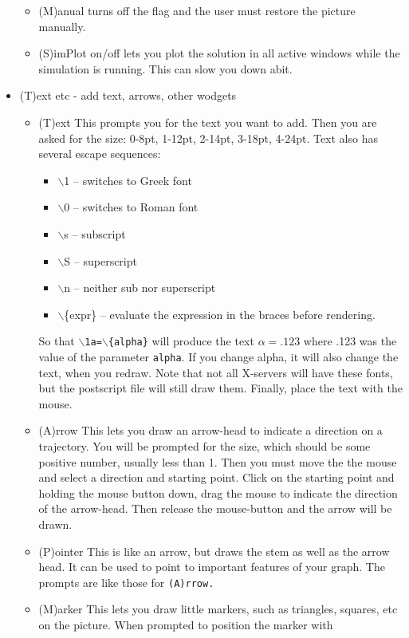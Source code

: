 \documentclass{article}
\begin{document}
\begin{itemize}
\begin{itemize}
\item (M)anual turns off the flag and the user must restore the picture manually.
\item (S)imPlot on/off lets you plot the solution in all active
windows while the simulation is running. This can slow you down abit.
\end{itemize}
\item (T)ext etc - add text, arrows, other wodgets
\begin{itemize}
\item (T)ext This prompts you for the text you want to add.  Then you
are asked for the size: 0-8pt, 1-12pt, 2-14pt,
3-18pt, 4-24pt. Text also has several escape sequences:
\begin{itemize}
\item $\backslash$1 -- switches to Greek font 
\item $\backslash$0 -- switches to Roman font 
\item $\backslash$s -- subscript
\item $\backslash$S -- superscript
\item  $\backslash$n -- neither sub nor superscript
\item $\backslash$\{expr\} -- evaluate the expression in the braces before   rendering.
\end{itemize}
So that {\tt $\backslash$1a=$\backslash$\{alpha\}} will produce the text $\alpha=.123$ where .123 was the value of the parameter {\tt alpha}. If you change alpha, it will also change the text, when you redraw. 
Note that not all X-servers will have these fonts, but the
postscript file will still draw them. Finally, place the text with the
mouse.
\item (A)rrow This lets you draw an arrow-head to indicate a direction
on a trajectory.  You will be prompted for the size, which should be
some positive number, usually less than 1.  Then you must move the the
mouse and select a direction and starting point.  Click on the
starting point and holding the mouse button down, drag the mouse to
indicate the direction of the arrow-head. Then release the
mouse-button and the arrow will be drawn.  
\item (P)ointer This is like an arrow, but draws the stem as well as
the arrow head.  It can be used to point to important features of your
graph. The prompts are like those for {\tt (A)rrow.}
\item (M)arker This lets you draw little markers, such as triangles,
squares, etc on the picture. When prompted to position the marker with

\end{itemize}
\end{itemize}
\end{document}

